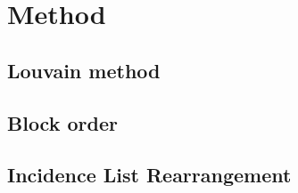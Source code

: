 \chapter{Method}\label{\positionnumber}
    \section{Louvain method}\label{\positionnumber}
    
    \section{Block order}\label{\positionnumber}
    
    \section{Incidence List Rearrangement}\label{\positionnumber}
